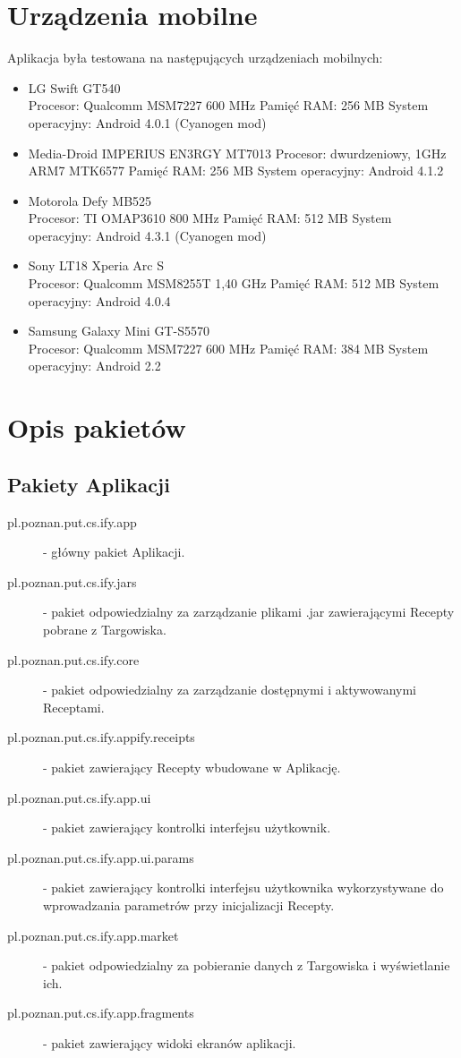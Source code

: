 \documentclass[11pt,a4paper,polish,thesis]{dcsbook}
\begin{document}
\section{Urządzenia mobilne}
Aplikacja była testowana na następujących urządzeniach mobilnych:
\begin{itemize}
\item{LG Swift GT540} \\
Procesor: Qualcomm MSM7227 600 MHz
Pamięć RAM: 256 MB
System operacyjny: Android 4.0.1 (Cyanogen mod)
\item{Media-Droid IMPERIUS EN3RGY MT7013}
Procesor: dwurdzeniowy, 1GHz ARM7 MTK6577
Pamięć RAM: 256 MB
System operacyjny: Android 4.1.2
\item{Motorola Defy MB525} \\
Procesor: TI OMAP3610 800 MHz
Pamięć RAM: 512 MB
System operacyjny: Android 4.3.1 (Cyanogen mod)
\item{Sony LT18 Xperia Arc S} \\
Procesor: Qualcomm MSM8255T 1,40 GHz
Pamięć RAM: 512 MB
System operacyjny: Android 4.0.4
\item{Samsung Galaxy Mini GT-S5570} \\
Procesor: Qualcomm MSM7227 600 MHz
Pamięć RAM: 384 MB
System operacyjny: Android 2.2
\end{itemize}

\section{Opis pakietów}
\subsection{Pakiety Aplikacji}
\begin{description}
\item[pl.poznan.put.cs.ify.app] - główny pakiet Aplikacji.
\item[pl.poznan.put.cs.ify.jars] - pakiet odpowiedzialny za zarządzanie plikami .jar zawierającymi Recepty pobrane z Targowiska.
\item[pl.poznan.put.cs.ify.core] - pakiet odpowiedzialny za zarządzanie dostępnymi i aktywowanymi Receptami.
\item[pl.poznan.put.cs.ify.appify.receipts] - pakiet zawierający Recepty wbudowane w Aplikację.
\item[pl.poznan.put.cs.ify.app.ui] - pakiet zawierający kontrolki interfejsu użytkownik.
\item[pl.poznan.put.cs.ify.app.ui.params] - pakiet zawierający kontrolki interfejsu użytkownika wykorzystywane do wprowadzania parametrów przy inicjalizacji Recepty.
\item[pl.poznan.put.cs.ify.app.market] - pakiet odpowiedzialny za pobieranie danych z Targowiska i wyświetlanie ich.
\item[pl.poznan.put.cs.ify.app.fragments] - pakiet zawierający widoki ekranów aplikacji.
\end{description}
\end{document}
